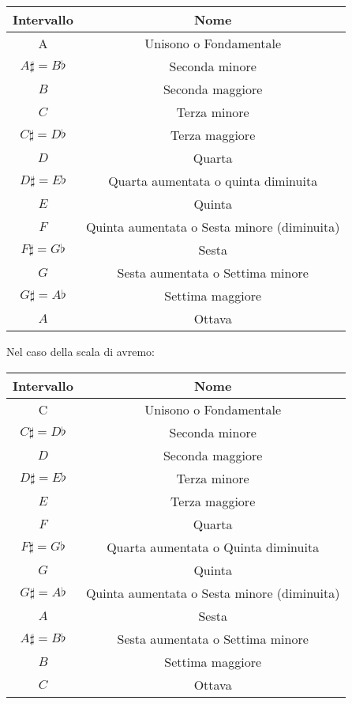 \documentclass[12pt,a4paper]{report}
\theoremstyle{definition}
\theoremstyle{Theorem}
\theoremstyle{definition}
\theoremstyle{definition}
\theoremstyle{definition}
\begin{document}
	  \begin{center}
	  	\begin{tabular}{||c|c||} 
	  		\hline
	  		Intervallo & Nome \\ [0.5ex] 
	  		\hline\hline
	  		A & Unisono o Fondamentale \\ 
	  		\hline
	  		$A\sharp=B\flat$ & Seconda minore \\
	  		\hline
	  		$B$ & Seconda maggiore\\
	  		\hline
	  		$C$ & Terza minore\\
	  		\hline
	  		$C\sharp=D\flat$ & Terza maggiore \\ [1ex] 
	  		\hline
	  		$D$ & Quarta \\
	  		\hline
	  		$D\sharp=E\flat$ & Quarta aumentata o quinta diminuita\\
	  		\hline
	  		$E$ & Quinta\\
	  		\hline
	  		$F$ & Quinta aumentata o Sesta minore (diminuita) \\ [1ex] 
	  		\hline
	  		$F\sharp=G\flat$ & Sesta \\
	  		\hline
	  		$G$ & Sesta aumentata o Settima minore\\
	  		\hline
	  		$G\sharp=A\flat$ & Settima maggiore\\
	  		\hline
	  		$A$ & Ottava \\  
	  		\hline
	  	\end{tabular}
	  \end{center}
	  Nel caso della scala di avremo:
	  	  \begin{center}
	  	\begin{tabular}{||c|c||} 
	  		\hline
	  		Intervallo & Nome \\ [0.5ex] 
	  		\hline\hline
	  		C & Unisono o Fondamentale \\ 
	  		\hline
	  		$C\sharp=D\flat$ & Seconda minore \\
	  		\hline
	  		$D$ & Seconda maggiore\\
	  		\hline
	  		$D\sharp=E\flat$ & Terza minore\\
	  		\hline
	  		$E$ & Terza maggiore \\ [1ex] 
	  		\hline
	  		$F$ & Quarta \\
	  		\hline
	  		$F\sharp=G\flat$ & Quarta aumentata o Quinta diminuita\\
	  		\hline
	  		$G$ & Quinta\\
	  		\hline
	  		$G\sharp=A\flat$ & Quinta aumentata o Sesta minore (diminuita) \\  
	  		\hline
	  		$A$ & Sesta \\
	  		\hline
	  		$A\sharp=B\flat$ & Sesta aumentata o Settima minore\\
	  		\hline
	  		$B$ & Settima maggiore\\
	  		\hline
	  		$C$ & Ottava \\  
	  		\hline
	  	\end{tabular}
	  \end{center}
\end{document}
